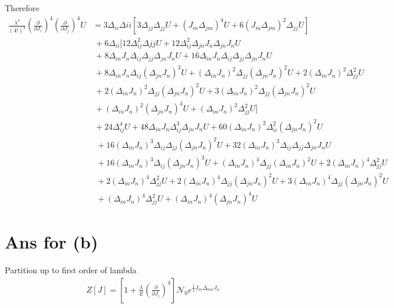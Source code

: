 \documentclass[12pt, letterpaper]{article}
\newcommand*{\1}{\hspace{1pt}}
\begin{document}
     Therefore 
     \begin{align*}
        \frac{\lambda ^4}{(4!)^4}(\frac{\partial}{\partial J_{i}})^{4}(\frac{\partial}{\partial J_{j}})^{4}U & = 3\Delta_{ii}\Delta{ii}[3\Delta_{jj}\Delta_{jj}U + (J_{m}\Delta_{jm})^{4} U + 6(J_{m}\Delta_{jm})^{2}\Delta_{jj} U] \\
        & \  +  6\Delta_{ii}[12\Delta_{ij}^{2}\Delta{jj}U + 12\Delta_{ij}^{2}\Delta_{jn}J_{n}\Delta_{jn}J_{n}U \\ 
        & \  + 8\Delta_{in}J_{n}\Delta_{ij}\Delta_{jj}\Delta_{jn}J_{n}U + 16\Delta_{in}J_{n}\Delta_{ij}\Delta_{jj}\Delta_{jn}J_{n}U \\ 
        & \  + 8\Delta_{in}J_{n}\Delta_{ij}(\Delta_{jn}J_{n})^{3}U + (\Delta_{in}J_{n})^{2}\Delta_{jj}(\Delta_{jn}J_{n})^{2}U + 2(\Delta_{in}J_{n})^{2}\Delta_{jj}^{2}U  \\ 
        & \  + 2(\Delta_{in}J_{n})^{2}\Delta_{jj}(\Delta_{jn}J_{n})^{2}U + 3(\Delta_{in}J_{n})^{2}\Delta_{jj}(\Delta_{jn}J_{n})^{2}U \\ 
        & \  + (\Delta_{in}J_{n})^{2}(\Delta_{jn}J_{n})^{4}U + (\Delta_{in}J_{n})^{2}\Delta_{jj}^{2}U ] \\
        & \ + 24\Delta_{ij}^{4}U + 48\Delta_{in}J_{n}\Delta_{ij}^{3}\Delta_{jn}J_{n}U + 60(\Delta_{in}J_{n})^{2}\Delta_{ii}^{2}(\Delta_{jn}J_{n})^{2}U \\ 
        & \ \  + 16(\Delta_{in}J_{n})^{3}\Delta_{ij}\Delta_{jj}(\Delta_{jn}J_{n})^{2}U + 32(\Delta_{in}J_{n})^{3}\Delta_{ij}\Delta_{jj}\Delta_{jn}J_{n}U \\ 
        & \ \  + 16(\Delta_{in}J_{n})^{3}\Delta_{ij}(\Delta_{jn}J_{n})^{3}U + (\Delta_{in}J_{n})^{4}\Delta_{jj}(\Delta_{in}J_{n})^{2}U + 2(\Delta_{in}J_{n})^{4}\Delta_{jj}^{2}U \\ 
        & \ \  + 2(\Delta_{in}J_{n})^{4}\Delta_{jj}^{2}U + 2(\Delta_{in}J_{n})^{4}\Delta_{jj}(\Delta_{jn}J_{n})^{2}U + 3(\Delta_{in}J_{n})^{4}\Delta_{jj}(\Delta_{jn}J_{n})^{2}U \\ 
        & \ \  + (\Delta_{in}J_{n})^{4}\Delta_{jj}^{2}U + (\Delta_{in}J_{n})^{4}(\Delta_{jn}J_{n})^{4}U
     \end{align*}
    \section*{Ans for (b)}

    Partition up to first order of lambda 
    \begin{align}
        Z[J] = [1 + \frac{\lambda}{4!}(\frac{\partial}{\partial J_{i}})^{4}]\mathcal{N}_{0} e^{\frac{1}{2} J_{m} \Delta _{mn} J_{n}}
    \end{align}
\end{document}
